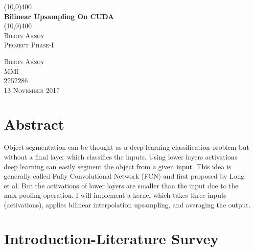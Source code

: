 \documentclass[]{article}
\begin{document}
\begin{titlepage}
	\begin{center}
		\line(10,0){400}\\
		[4mm] %
		\huge{\bfseries Bilinear Upsampling On CUDA} \\
		[1mm]
		\line(10,0){400}\\
		[1 cm]
		\textsc{\LARGE Bilgin Aksoy}\\
		[1 cm]
		\textsc{\large Project Phase-I}\\
		[10 cm]
	\end{center}
	
	\begin{flushright}
		\textsc{\large Bilgin Aksoy\\
		MMI\\
		2252286\\
		13 November 2017\\
		}
	\end{flushright}
\end{titlepage} 
\setcounter{page}{1}

\section{Abstract}
\justifying Object segmentation can be thought as a deep learning classification problem but without a final layer which classifies the inputs. Using lower layers activations deep learning can easily segment the  object from a given input. This idea is generally called Fully Convolutional Network (FCN) and first proposed by Long et al. \cite{long2015fully} But the activations of lower layers are smaller than the input due to the max-pooling operation. I will implement a kernel which takes three inputs (activations), applies bilinear interpolation upsampling, and averaging the output.

\section{Introduction-Literature Survey}
\end{document}
